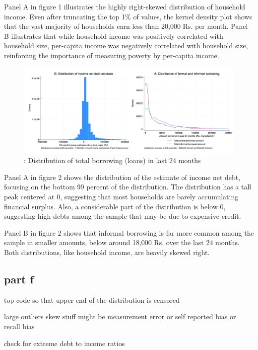 \documentclass[12pt]{article}
\begin{document}
Panel A in figure 1 illustrates the highly right-skewed distribution of household income. Even after truncating the top 1\% of values, the kernel density plot shows that the vast majority of households earn less than 20,000 Rs. per month. Panel B illustrates that while household income was positively correlated with household size, per-capita income was negatively correlated with household size, reinforcing the importance of measuring poverty by per-capita income.


\begin{figure}[H]
    \centering
    \includegraphics[width=\textwidth]{figures/figure02_loandistribution.png}
    \caption{: Distribution of total borrowing (loans) in last 24 months}
\end{figure}

Panel A in figure 2 shows the distribution of the estimate of income net debt, focusing on the bottom 99 percent of the distribution. The distribution has a tall peak centered at 0, suggesting that most households are barely accumulating financial surplus. Also, a considerable part of the distribution is below 0, suggesting high debts among the sample that may be due to expensive credit. 

Panel B in figure 2 shows that informal borrowing is far more common among the sample in smaller amounts, below around 18,000 Rs. over the last 24 months. Both distributions, like household income, are heavily skewed right. 


\subsection{part f}

top code so that upper end of the distribution is censored

large outliers skew stuff
might be measurement error or self reported bias or recall bias

check for extreme debt to income ratios 
\end{document}
